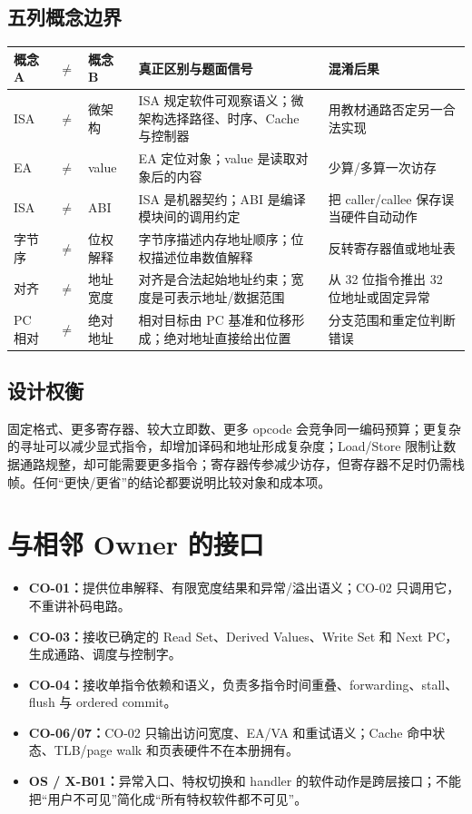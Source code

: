 \documentclass[UTF8,fontset=fandol,11pt,a4paper]{ctexart}
\newcommand{\kw}[1]{\textbf{\color{deep}#1}}
\begin{document}
\subsection{五列概念边界}
\begin{center}
\small
\begin{tabularx}{\linewidth}{L{1.8cm}C{0.35cm}L{1.8cm}Y Y}
\toprule
概念 A & $\neq$ & 概念 B & 真正区别与题面信号 & 混淆后果\\
\midrule
ISA & $\neq$ & 微架构 & ISA 规定软件可观察语义；微架构选择路径、时序、Cache 与控制器 & 用教材通路否定另一合法实现\\
EA & $\neq$ & value & EA 定位对象；value 是读取对象后的内容 & 少算/多算一次访存\\
ISA & $\neq$ & ABI & ISA 是机器契约；ABI 是编译模块间的调用约定 & 把 caller/callee 保存误当硬件自动动作\\
字节序 & $\neq$ & 位权解释 & 字节序描述内存地址顺序；位权描述位串数值解释 & 反转寄存器值或地址表\\
对齐 & $\neq$ & 地址宽度 & 对齐是合法起始地址约束；宽度是可表示地址/数据范围 & 从 32 位指令推出 32 位地址或固定异常\\
PC 相对 & $\neq$ & 绝对地址 & 相对目标由 PC 基准和位移形成；绝对地址直接给出位置 & 分支范围和重定位判断错误\\
\bottomrule
\end{tabularx}
\end{center}

\subsection{设计权衡}
固定格式、更多寄存器、较大立即数、更多 opcode 会竞争同一编码预算；更复杂的寻址可以减少显式指令，却增加译码和地址形成复杂度；Load/Store 限制让数据通路规整，却可能需要更多指令；寄存器传参减少访存，但寄存器不足时仍需栈帧。任何“更快/更省”的结论都要说明比较对象和成本项。

\section{与相邻 Owner 的接口}

\begin{itemize}
  \item \kw{CO-01：}提供位串解释、有限宽度结果和异常/溢出语义；CO-02 只调用它，不重讲补码电路。
  \item \kw{CO-03：}接收已确定的 Read Set、Derived Values、Write Set 和 Next PC，生成通路、调度与控制字。
  \item \kw{CO-04：}接收单指令依赖和语义，负责多指令时间重叠、forwarding、stall、flush 与 ordered commit。
  \item \kw{CO-06/07：}CO-02 只输出访问宽度、EA/VA 和重试语义；Cache 命中状态、TLB/page walk 和页表硬件不在本册拥有。
  \item \kw{OS / X-B01：}异常入口、特权切换和 handler 的软件动作是跨层接口；不能把“用户不可见”简化成“所有特权软件都不可见”。
\end{itemize}
\end{document}
